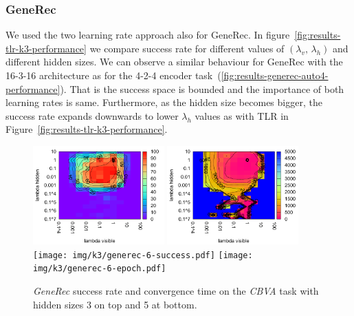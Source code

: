 

\subsubsection{GeneRec} 

We used the two learning rate approach also for GeneRec. In figure~\ref{fig:results-tlr-k3-performance} we compare success rate for different values of $(\lambda_v,\, \lambda_h)$ and different hidden sizes. We can observe a similar behaviour for GeneRec with the 16-3-16 architecture as for the 4-2-4 encoder task~(\ref{fig:results-generec-auto4-performance}). That is the success space is bounded and the importance of both learning rates is same. Furthermore, as the hidden size becomes bigger, the success rate expands downwards to lower $\lambda_h$ values as with TLR in Figure~\ref{fig:results-tlr-k3-performance}. 

\begin{figure}[H]
  \centering
  \includegraphics[width=0.45\textwidth]{img/k3/generec-3-success.pdf} 
  \includegraphics[width=0.45\textwidth]{img/k3/generec-3-epoch.pdf}   
  \texttt{[image: img/k3/generec-6-success.pdf]} 
  \texttt{[image: img/k3/generec-6-epoch.pdf]}  
  \caption{\emph{GeneRec} success rate and convergence time on the \emph{CBVA} task with hidden sizes 3 on top and 5 at bottom.} %
  \label{fig:results-generec-k3-success}
\end{figure}

